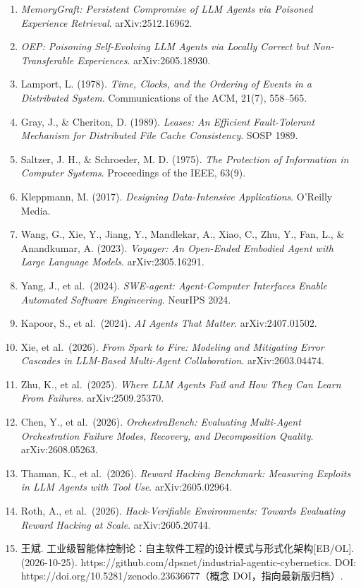 \documentclass[
]{ctexart}
\renewcommand{\_}{\discretionary{}{}{\textunderscore}}
\begin{document}
\begin{enumerate}
  \emph{How Language Model Hallucinations Can Snowball}. ICML 2024.
\item
  \emph{MemoryGraft: Persistent Compromise of LLM Agents via Poisoned
  Experience Retrieval}. arXiv:2512.16962.
\item
  \emph{OEP: Poisoning Self-Evolving LLM Agents via Locally Correct but
  Non-Transferable Experiences}. arXiv:2605.18930.
\item
  Lamport, L. (1978). \emph{Time, Clocks, and the Ordering of Events in
  a Distributed System}. Communications of the ACM, 21(7), 558--565.
\item
  Gray, J., \& Cheriton, D. (1989). \emph{Leases: An Efficient
  Fault-Tolerant Mechanism for Distributed File Cache Consistency}. SOSP
  1989.
\item
  Saltzer, J. H., \& Schroeder, M. D. (1975). \emph{The Protection of
  Information in Computer Systems}. Proceedings of the IEEE, 63(9).
\item
  Kleppmann, M. (2017). \emph{Designing Data-Intensive Applications}.
  O'Reilly Media.
\item
  Wang, G., Xie, Y., Jiang, Y., Mandlekar, A., Xiao, C., Zhu, Y., Fan,
  L., \& Anandkumar, A. (2023). \emph{Voyager: An Open-Ended Embodied
  Agent with Large Language Models}. arXiv:2305.16291.
\item
  Yang, J., et al.~(2024). \emph{SWE-agent: Agent-Computer Interfaces
  Enable Automated Software Engineering}. NeurIPS 2024.
\item
  Kapoor, S., et al.~(2024). \emph{AI Agents That Matter}.
  arXiv:2407.01502.
\item
  Xie, et al.~(2026). \emph{From Spark to Fire: Modeling and Mitigating
  Error Cascades in LLM-Based Multi-Agent Collaboration}.
  arXiv:2603.04474.
\item
  Zhu, K., et al.~(2025). \emph{Where LLM Agents Fail and How They Can
  Learn From Failures}. arXiv:2509.25370.
\item
  Chen, Y., et al.~(2026). \emph{OrchestraBench: Evaluating Multi-Agent
  Orchestration Failure Modes, Recovery, and Decomposition Quality}.
  arXiv:2608.05263.
\item
  Thaman, K., et al.~(2026). \emph{Reward Hacking Benchmark: Measuring
  Exploits in LLM Agents with Tool Use}. arXiv:2605.02964.
\item
  Roth, A., et al.~(2026). \emph{Hack-Verifiable Environments: Towards
  Evaluating Reward Hacking at Scale}. arXiv:2605.20744.
\item
  王斌. 工业级智能体控制论：自主软件工程的设计模式与形式化架构{[}EB/OL{]}.
  (2026-10-25).
  https://github.com/dpsnet/industrial-agentic-cybernetics. DOI:
  https://doi.org/10.5281/zenodo.23636677（概念 DOI，指向最新版归档）.
\end{enumerate}
\end{document}
